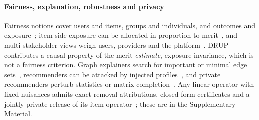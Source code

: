 \documentclass[preprint,review,12pt,authoryear]{elsarticle}
\theoremstyle{definition}
\begin{document}
\paragraph{Fairness, explanation, robustness and privacy}
Fairness notions cover users and items, groups and individuals, and outcomes and
exposure~\citep{wang2023fairness,amigo2023fairness}; item-side exposure can be
allocated in proportion to merit~\citep{singh2018exposure,diaz2020expected}, and
multi-stakeholder views weigh users, providers and the
platform~\citep{abdollahpouri2020multistakeholder,ekstrand2022fairness}. DRUP
contributes a causal property of the merit \emph{estimate}, exposure invariance,
which is not a fairness criterion. Graph explainers search for important or
minimal edge sets~\citep{ying2019gnnexplainer,lucic2022cfgnn,ghazimatin2020prince},
recommenders can be attacked by injected
profiles~\citep{lam2004shilling,li2016poisoning,fang2018poisoning}, and private
recommenders perturb statistics or matrix
completion~\citep{mcsherry2009netflix,jain2018dpmc}. Any linear operator with fixed
nuisances admits exact removal attributions, closed-form certificates and a jointly
private release of its item operator~\citep{balle2018analytic,hsu2014matchings};
these are in the Supplementary Material.
\end{document}
